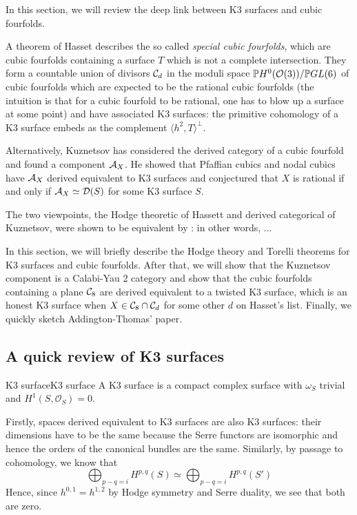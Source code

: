 In this section, we will review the deep link between K3 surfaces and cubic fourfolds. 

 A theorem of Hasset describes the so called \emph{special cubic fourfolds}, which are cubic fourfolds containing a surface $T$ which is not a complete intersection. They form a countable union of divisors $\mathcal{C}_d$ in the moduli space $\mathbb{P} H^0(\mathcal{O}(3))/\mathbb{P} GL(6)$ of cubic fourfolds which are expected to be the rational cubic fourfolds (the intuition is that for a cubic fourfold to be rational, one has to blow up a surface at some point) and have associated K3 surfaces: the primitive cohomology of a K3 surface embeds as the complement $\langle h^2, T\rangle^\perp$. 

Alternatively, Kuznetsov has considered the derived category of a cubic fourfold and found a component $\mathcal{A}_X$. He showed that Pfaffian cubics and nodal cubics have $\mathcal{A}_X$ derived equivalent to K3 surfaces and conjectured \cite{KuznetsovDerivedCubic} that $X$ is rational if and only if $\mathcal{A}_X \simeq \mathcal{D}(S)$ for some K3 surface $S$.

The two viewpoints, the Hodge theoretic of Hassett and derived categorical of Kuznetsov, were shown to be equivalent by \cite{addington_hodge_2014}: in other words, ...

In this section, we will briefly describe the Hodge theory and Torelli theorems for K3 surfaces and cubic fourfolds. After that, we will show that the Kuznetsov component is a Calabi-Yau 2 category and show that the cubic fourfolds containing a plane $\mathcal{C}_8$ are derived equivalent to a twisted K3 surface, which is an honest K3 surface when $X\in \mathcal{C}_8 \cap \mathcal{C}_d$ for some other $d$ on Hasset's list. Finally, we quickly sketch Addington-Thomas' paper.



\subsection{A quick review of K3 surfaces}
\begin{definition}{K3 surface}{K3 surface}
A K3 surface is a compact complex surface with $\omega_{S}$ trivial and $H^1(S,\mathcal{O}_{S})=0$.
\end{definition}

Firstly, spaces derived equivalent to K3 surfaces are also K3 surfaces: their dimensions have to be the same because the Serre functors are isomorphic and hence the orders of the canonical bundles are the same. Similarly, by passage to cohomology, we know that $$\bigoplus_{p-q=i}H^{p,q}(S)\simeq \bigoplus_{p-q=i}H^{p,q}(S')$$
Hence, since $h^{0,1}=h^{1,2}$ by Hodge symmetry and Serre duality, we see that both are zero.

